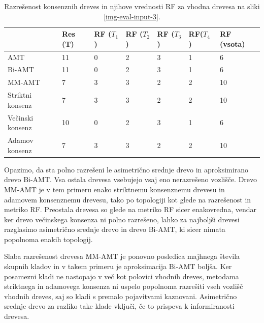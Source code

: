 \documentclass[a4paper, 12pt]{book}
\begin{document}
\begin{table}[h!]
	\begin{center}
	{\footnotesize
	\begin{tabular}{ l| l | l | l | l | l | l }
	~                & Res (T)      & RF ($T_1$) & RF ($T_2$)       & RF ($T_3$) & RF($T_4$) & RF (vsota) \\ \hline
	AMT              & 11          & 0          & 2                & 3          & 1         & 6          \\ \hline
	Bi-AMT           & 11          & 0          & 2                & 3          & 1         & 6          \\ \hline
	MM-AMT           & 7           & 3          & 3                & 2          & 2         & 10         \\ \hline
	Striktni konsenz & 7           & 3          & 3                & 2          & 2         & 10         \\ \hline
	Večinski konsenz & 10          & 0          & 2                & 3          & 1         & 6          \\ \hline
	Adamov konsenz   & 7           & 3          & 3                & 2          & 2         & 10         \\ \hline
	\end{tabular}
	\caption{\label{table-eval-3}Razrešenost konsenznih dreves in njihove vrednosti RF za vhodna drevesa na sliki \ref{img-eval-input-3}.}
	}
	\end{center}		
\end{table}

Opazimo, da sta polno razrešeni le asimetrično srednje drevo in aproksimirano 
drevo Bi-AMT. Vsa ostala drevesa vsebujejo vsaj eno nerazrešeno vozlišče. 
Drevo MM-AMT je v tem primeru enako striktnemu konsenznemu drevesu in adamovem 
konsenznemu drevesu, tako po topologiji kot glede na razrešenost in metriko RF. 
Preostala drevesa so glede na metriko RF sicer enakovredna, vendar ker drevo 
večinskega konsenza ni polno razrešeno, lahko za najboljši drevesi razglasimo 
asimetrično  srednje drevo in drevo Bi-AMT, ki sicer nimata popolnoma enakih 
topologij.

Slaba razrešenost drevesa MM-AMT je ponovno posledica majhnega števila skupnih
kladov in v takem primeru je aproksimacija Bi-AMT boljša. Ker posamezni kladi 
ne nastopajo v več kot polovici vhodnih dreves, metodama striktnega in adamovega 
konsenza ni uspelo popolnoma razrešiti vseh vozlišč vhodnih dreves, saj so kladi 
s premalo pojavitvami kaznovani. Asimetrično srednje drevo za razliko take klade
vključi, če to prispeva k informiranosti drevesa.
\end{document}
